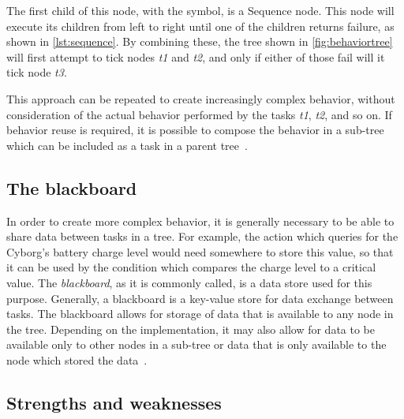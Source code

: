 \documentclass[\rootfolder/main.tex]{subfiles}
\begin{document}
The first child of this node, with the \emph{\rightarrow} symbol, is a Sequence node.
This node will execute its children from left to right until one of the children returns failure, as shown in \cref{lst:sequence}.
By combining these, the tree shown in \cref{fig:behaviortree} will first attempt to tick nodes \emph{t1} and \emph{t2}, and only if either of those fail will it tick node \emph{t3}.

This approach can be repeated to create increasingly complex behavior, without consideration of the actual behavior performed by the tasks \emph{t1}, \emph{t2}, and so on.
If behavior reuse is required, it is possible to compose the behavior in a sub-tree which can be included as a task in a parent tree~\cite{Millington2009}.


\subsection{The blackboard}

In order to create more complex behavior, it is generally necessary to be able to share data between tasks in a tree.
For example, the action which queries for the Cyborg's battery charge level would need somewhere to store this value, so that it can be used by the condition which compares the charge level to a critical value.
The \emph{blackboard}, as it is commonly called, is a data store used for this purpose.
Generally, a blackboard is a key-value store for data exchange between tasks.
The blackboard allows for storage of data that is available to any node in the tree.
Depending on the implementation, it may also allow for data to be available only to other nodes in a sub-tree or data that is only available to the node which stored the data~\cite{Millington2009}.


\subsection{Strengths and weaknesses}
\end{document}
